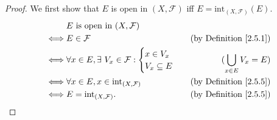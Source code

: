 \begin{proof}
    We first show that \(E\) is open in \((X, \mathcal{F})\) iff \(E = \text{int}_{(X, \mathcal{F})}(E)\).
    \begin{align*}
             & E \text{ is open in } (X, \mathcal{F})                                                             \\
        \iff & E \in \mathcal{F}                                             & \text{(by Definition \ref{2.5.1})} \\
        \iff & \forall x \in E, \exists\ V_x \in \mathcal{F} : \begin{cases}
                                                                   x \in V_x \\
                                                                   V_x \subseteq E
                                                               \end{cases} & (\bigcup_{x \in E} V_x = E)          \\
        \iff & \forall x \in E, x \in \text{int}_{(X, \mathcal{F})}          & \text{(by Definition \ref{2.5.5})} \\
        \iff & E = \text{int}_{(X, \mathcal{F})}.                            & \text{(by Definition \ref{2.5.5})}
    \end{align*}


\end{proof}
